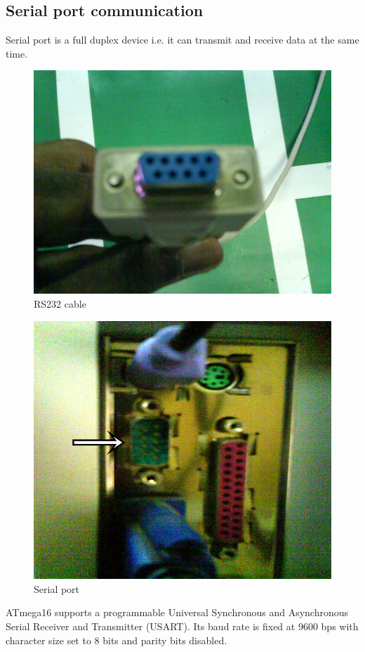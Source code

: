 \documentclass[12pt]{report}
\begin{document}
\subsection{Serial port communication}
Serial port is a full duplex device i.e. it can transmit and receive data at the same time.\begin{figure}
\centering
\includegraphics[width=0.5\linewidth]{RS232cable.jpg}
\caption{RS232 cable}
\end{figure}
\begin{figure}
\centering
\includegraphics[width=0.5\linewidth]{Serialport.jpg}
\caption{Serial port}
\end{figure}
ATmega16 supports a programmable Universal Synchronous and Asynchronous Serial Receiver and Transmitter (USART). Its baud rate is fixed at 9600 bps with character size set to 8 bits and parity bits disabled.
\end{document}
